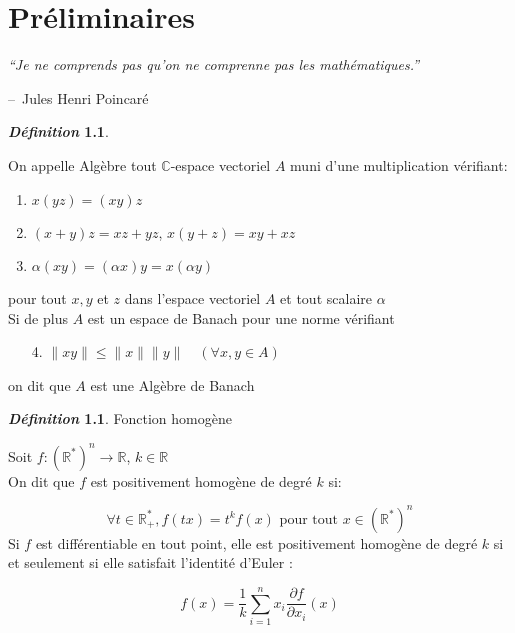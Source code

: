 \documentclass[12pt,a4paper]{report}
\makeatletter
\theoremstyle{plain}
\theoremstyle{definition}
\newtheorem{defn}[theo]{\textit{Définition}}
\theoremstyle{remark}
\newcommand{\C}{\ensuremath{\mathbb{C}}}
\newcommand{\M}{\ensuremath{\mathbb{R}}}
\newcommand{\Me}{\ensuremath{\mathbb{R}^*}}
\newcommand{\Mep}{\ensuremath{{\mathbb{R}}_+^*}}
\newenvironment{chapquote}[2][2em]
  {\setlength{\@tempdima}{#1}%
   \def\chapquote@author{#2}%
   \parshape 1 \@tempdima \dimexpr\textwidth-2\@tempdima\relax%
   \itshape}
  {\par\normalfont\hfill--\ \chapquote@author\hspace*{\@tempdima}\par\bigskip}
\makeatother
\begin{document}
 \thispagestyle{plain}











\chapter{Préliminaires}

\begin{chapquote}{Jules Henri Poincaré}
``Je ne comprends pas qu’on ne comprenne pas les mathématiques.''
\end{chapquote}

\begin{defn}\cite{rudin}


 On appelle Algèbre  tout $\C$-espace vectoriel $A$ muni d'une multiplication  vérifiant:
  \begin{enumerate}
  \item $x(yz)=(xy)z$
  \item $(x+y)z=xz+yz$, $x(y+z)=xy+xz$
  \item $ \alpha(xy)=(\alpha x)y=x(\alpha y)$
  \end{enumerate}
  pour tout $x,y$ et $z$ dans l'espace vectoriel $A$ et tout scalaire $\alpha$\\
  
  Si de plus $A$ est un espace de Banach pour une norme vérifiant 
  \begin{itemize}
  \item[4.] $\|xy\| \leq \|x\| \|y\| \quad (\forall x,y \in A )$
  \end{itemize}
   on dit que $A$ est une Algèbre de Banach
 
  
\end{defn}

\begin{defn}\cite{homo}{Fonction homogène}

Soit $ f: (\Me)^n \rightarrow \M$, $ k \in \M$\\
On dit que $f$ est positivement homogène de degré $k$ si: 

$$ \forall t \in \Mep, f(tx)=t^kf(x) \text{ pour tout } x \in  (\Me)^n$$
Si $f$ est différentiable en tout point, elle est positivement homogène de degré $k$ si et seulement si elle satisfait l'identité d'Euler :

$$ f(x) = \frac{1}{k} \sum_{i=1}^n x_i \frac{\partial f}{\partial x_i}(x)$$



\end{defn}
\end{document}
